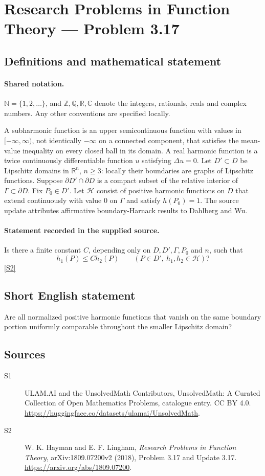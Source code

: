 \documentclass[11pt]{article}
\newcommand{\sref}[2]{\hyperlink{source:#1:#2}{[S#2]}}
\begin{document}
\section{Research Problems in Function Theory — Problem 3.17}\label{statement}

\subsection{Definitions and mathematical statement}

\paragraph{Shared notation.}$\mathbb N=\{1,2,\ldots\}$, and $\mathbb Z,\mathbb Q,\mathbb R,\mathbb C$ denote the integers, rationals, reals and complex numbers. Any other conventions are specified locally.


A subharmonic function is an upper semicontinuous function with values in $[-\infty,\infty)$, not identically $-\infty$ on a connected component, that satisfies the mean-value inequality on every closed ball in its domain. A real harmonic function is a twice continuously differentiable function $u$ satisfying $\Delta u=0$. Let $D'\subset D$ be Lipschitz domains in $\mathbb R^n$, $n\geq3$: locally their boundaries are graphs of Lipschitz functions. Suppose $\partial D'\cap\partial D$ is a compact subset of the relative interior of $\Gamma\subset\partial D$. Fix $P_0\in D'$. Let $\mathcal H$ consist of positive harmonic functions on $D$ that extend continuously with value $0$ on $\Gamma$ and satisfy $h(P_0)=1$.
The source update attributes affirmative boundary-Harnack results to Dahlberg and Wu.
\paragraph{Statement recorded in the supplied source.}
Is there a finite constant $C$, depending only on $D,D',\Gamma,P_0$ and $n$, such that
\[h_1(P)\leq C h_2(P)\qquad(P\in D',\ h_1,h_2\in\mathcal H)?\] \sref{statement}{2}
\subsection{Short English statement}
Are all normalized positive harmonic functions that vanish on the same boundary portion uniformly comparable throughout the smaller Lipschitz domain?
\subsection{Sources}
\begin{description}
\item[\hypertarget{source:statement:1}{S1}] ULAM.AI and the UnsolvedMath Contributors, UnsolvedMath: A Curated Collection of Open Mathematics Problems, catalogue entry. CC BY 4.0. \url{https://huggingface.co/datasets/ulamai/UnsolvedMath}.
\item[\hypertarget{source:statement:2}{S2}] W. K. Hayman and E. F. Lingham, \emph{Research Problems in Function Theory}, arXiv:1809.07200v2 (2018), Problem 3.17 and Update 3.17. \url{https://arxiv.org/abs/1809.07200}.
\end{description}
\label{end:statement}
\end{document}
